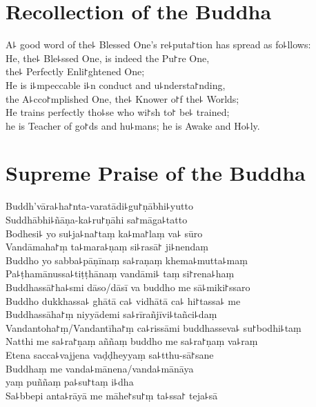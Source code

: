 \chapter{Recollection of the Buddha}%

\begin{leader}
\end{leader}

A꜕ good word of the꜕ Blessed One's re꜕puta꜓tion has spread as fo꜕llows:\\
He, the꜕ Ble꜕ssed One, is indeed the Pu꜓re One,\\
\vin the꜕ Perfectly Enli꜓ghtened One;\\
He is i꜕mpeccable i꜕n conduct and u꜕ndersta꜓nding,\\
\vin the A꜕cco꜓mplished One, the꜕ Knower o꜓f the꜕ Worlds;\\
He trains perfectly tho꜕se who wi꜓sh to꜓ be꜕ trained;\\
\vin he is Teacher of go꜓ds and hu꜕mans; he is Awake and Ho꜕ly.

\clearpage

\chPali
\chapter{Supreme Praise of the Buddha}%

\begin{leader}
\end{leader}

Buddh'vāra꜕ha꜓nta-varatādi꜕gu꜓ṇābhi꜕yutto\\
Suddhābhi꜕ñāṇa-ka꜕ru꜓ṇāhi sa꜓māga꜕tatto\\
Bodhesi꜕ yo su꜕ja꜕na꜓taṃ ka꜕ma꜓laṃ va꜕ sūro\\
Vandāmaha꜓ṃ ta꜕mara꜕ṇaṃ si꜕rasā꜓ ji꜕nendaṃ\\
Buddho yo sabba꜕pāṇīnaṃ sa꜕raṇaṃ khema꜕mutta꜕maṃ\\
Pa꜕ṭhamānussa꜕tiṭṭhānaṃ vandāmi꜕ taṃ si꜓rena꜕haṃ\\
Buddhassā꜓ha꜕smi dāso/dāsī va buddho me sā꜕miki꜓ssaro\\
Buddho dukkhassa꜕ ghātā ca꜕ vidhātā ca꜕ hi꜓tassa꜕ me\\
Buddhassāha꜓ṃ niyyādemi sa꜕rīrañjīvi꜕tañci꜕daṃ\\
Vandantoha꜓ṃ/Vandantīha꜓ṃ ca꜕rissāmi buddhasseva꜕ su꜓bodhi꜕taṃ\\
Natthi me sa꜕ra꜓ṇaṃ aññaṃ buddho me sa꜕ra꜓ṇaṃ va꜕raṃ\\
Etena sacca꜕vajjena vaḍḍheyyaṃ sa꜕tthu-sā꜓sane\\
Buddhaṃ me vanda꜕mānena/vanda꜕mānāya\\
\vin yaṃ puññaṃ pa꜕su꜓taṃ i꜕dha\\
Sa꜕bbepi anta꜕rāyā me māhe꜓su꜓ṃ ta꜕ssa꜓ teja꜕sā

